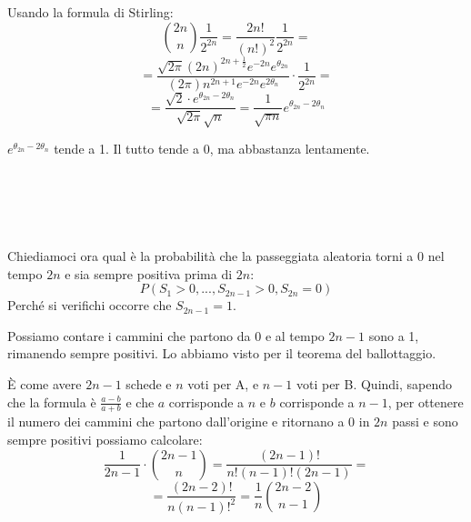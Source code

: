 \documentclass[a4paper,12pt]{book}
\newcommand\ddfrac[2]{\frac{\displaystyle #1}{\displaystyle #2}}
\begin{document}
Usando la formula di Stirling:
	$$ \binom{2n}{n} \frac{1}{2^{2n}} = \frac{2n!}{(n!)^2} \frac{1}{2^{2n}} = $$
	$$ = \ddfrac{\sqrt{2\pi}(2n)^{2n+\frac{1}{2}}e^{-2n} e^{\theta_{2n}}}{ (2\pi)n^{2n+1}e^{-2n}e^{2\theta_n}    }\cdot \frac{1}{2^{2n}} = $$
	$$ = \ddfrac{\sqrt{2} \cdot e^{\theta_{2n} - 2\theta_n}   } { \sqrt{2\pi}\sqrt{n}} = \frac{1}{\sqrt{\pi n}} e^{\theta_{2n} - 2\theta_n} $$

$ e^{\theta_{2n} - 2\theta_n} $ tende a 1. Il tutto tende a 0, ma abbastanza lentamente. 
\\
\\
\\
\\
\\
\\
Chiediamoci ora qual è la probabilità che la passeggiata aleatoria torni a 0 nel tempo $ 2n $ e sia sempre positiva prima di $ 2n $:
$$P(S_1 > 0, ..., S_{2n-1}>0, S_{2n} = 0)$$
Perché si verifichi occorre che $ S_{2n-1} = 1 $.
\begin{multicols}{2}
	Possiamo contare i cammini che partono da 0 e al tempo $ 2n-1 $ sono a 1, rimanendo sempre positivi. Lo abbiamo visto per il teorema del ballottaggio. 
	
	
	\begin{center}
	\end{center}
\end{multicols}

È come avere $ 2n-1 $ schede e $ n $ voti per A, e $ n-1 $ voti per B. Quindi, sapendo che la formula è $ \frac{a-b}{a+b} $ e che $ a $ corrisponde a $ n $ e $ b $ corrisponde a $ n-1 $, per ottenere il numero dei cammini che partono dall'origine e ritornano a 0 in $ 2n $ passi e sono sempre positivi possiamo calcolare:
$$ \frac{1}{2n-1} \cdot \binom{2n-1}{n} = \frac{(2n-1)!}{n!(n-1)!(2n-1)} = $$
$$ = \frac{(2n-2)!}{n(n-1)!^2} = \frac{1}{n} \binom{2n-2}{n-1} $$
\end{document}
